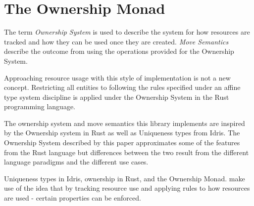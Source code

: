 \documentclass[onehalf,11pt]{beavtex}
\begin{document}



\chapter{The Ownership Monad}

The term \textit{Ownership System} is used to describe the system for how
resources are tracked and how they can be used once they are created.
\textit{Move Semantics} describe the outcome from using the operations provided
for the Ownership System.

Approaching resource usage with this style of implementation is not a new
concept. Restricting all entities to following the rules specified under an
affine type system discipline is applied under the Ownership System in the Rust
programming language. 

The ownership system and move semantics this library
implements are inspired by the Ownership system in Rust as well as
Uniqueness types from Idris.\cite{rust_book_ownership} \cite{idris_uniqueness_types}
The Ownership System described by this paper approximates some of the
features from the Rust language but differences between the two result from the
different language paradigms and the different use cases.

Uniqueness types in Idris, ownership in Rust, and the Ownership Monad.
make use of the idea that by tracking resource use and applying rules to how
resources are used - certain properties can be enforced.


\end{document}
